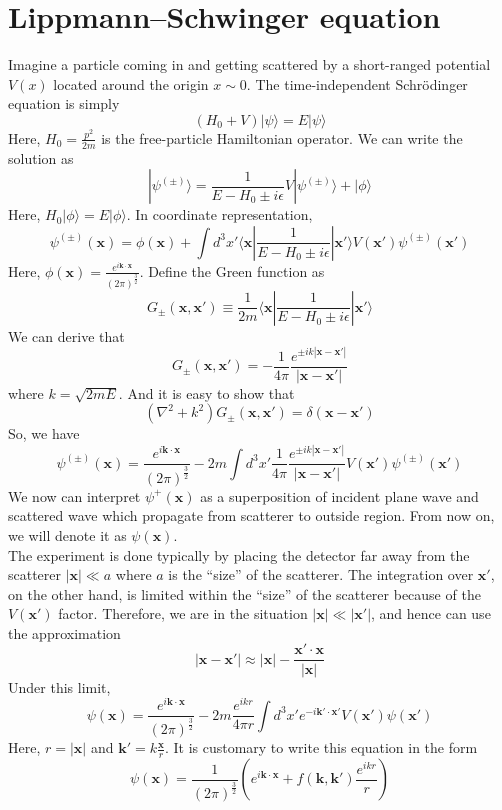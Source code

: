 \section{Lippmann–Schwinger equation}
Imagine a particle coming in and getting scattered by a short-ranged potential $V(x)$ located around the origin $x \sim 0$. The time-independent Schr\"{o}dinger equation is simply
\[(H_0 + V)|\psi\rangle = E |\psi\rangle\]
Here, $H_0 = \frac{p^2}{2m}$ is the free-particle Hamiltonian operator. We can write the solution as
\[|\psi^{(\pm)}\rangle = \frac{1}{E-H_0 \pm i\epsilon}V|\psi^{(\pm)}\rangle + |\phi\rangle\]
Here, $H_0 |\phi\rangle = E |\phi\rangle$. In coordinate representation,
\[\psi^{(\pm)}(\mathbf{x}) = \phi(\mathbf{x}) + \int d^3x' \langle \bm{x} | \frac{1}{E-H_0 \pm i\epsilon} | \bm{x}' \rangle V(\bm{x}') \psi^{(\pm)}(\bm{x}')\]
Here, $\phi(\bm{x}) = \frac{e^{i\bm{k}\cdot\bm{x}}}{(2\pi)^{\frac{3}{2}}}$. Define the Green function as
\[G_{\pm}(\bm{x},\bm{x}') \equiv \frac{1}{2m} \langle \bm{x} | \frac{1}{E-H_0 \pm i\epsilon} | \bm{x}' \rangle\]
We can derive that
\[G_{\pm}(\bm{x},\bm{x}') = -\frac{1}{4\pi} \frac{e^{\pm ik|\bm{x}-\bm{x}'|}}{|\bm{x}-\bm{x}'|}\]
where $k = \sqrt{2mE}$. And it is easy to show that
\[(\nabla^2 + k^2)G_{\pm}(\bm{x},\bm{x}') = \delta(\bm{x}-\bm{x}')\]
So, we have
\[\psi^{(\pm)}(\bm{x}) = \frac{e^{i\bm{k}\cdot\bm{x}}}{(2\pi)^{\frac{3}{2}}} - 2m \int d^3x' \frac{1}{4\pi} \frac{e^{\pm ik|\bm{x}-\bm{x}'|}}{|\bm{x}-\bm{x}'|} V(\bm{x}') \psi^{(\pm)}(\bm{x}')\]
We now can interpret $\psi^{+}(\bm{x})$ as a superposition of incident plane wave and scattered wave which propagate from scatterer to outside region. From now on, we will denote it as $\psi(\bm{x})$.
\\
The experiment is done typically by placing the detector far away from the scatterer $|\bm{x}| \ll a$ where $a$ is the ``size'' of the scatterer. The integration over $\bm{x}'$, on the other hand, is limited within the ``size'' of the scatterer because of the $V(\bm{x}')$ factor. Therefore, we are in the situation $|\bm{x}| \ll |\bm{x}'|$, and hence can use the approximation
\[|\bm{x}-\bm{x}'| \approx |\bm{x}| - \frac{\bm{x}' \cdot \bm{x}}{|\bm{x}|}\]
Under this limit,
\[\psi(\bm{x}) = \frac{e^{i\bm{k}\cdot\bm{x}}}{(2\pi)^{\frac{3}{2}}} - 2m \frac{e^{ikr}}{4\pi r} \int d^3x' e^{-i\bm{k}' \cdot \bm{x}'} V(\bm{x}') \psi(\bm{x}')\]
Here, $r = |\bm{x}|$ and $\bm{k}' = k \frac{\bm{x}}{r}$. It is customary to write this equation in the form
\[\psi(\bm{x}) = \frac{1}{(2\pi)^{\frac{3}{2}}}\left( e^{i\bm{k}\cdot\bm{x}} +  f(\bm{k},\bm{k}') \frac{e^{ikr}}{r} \right) \]
